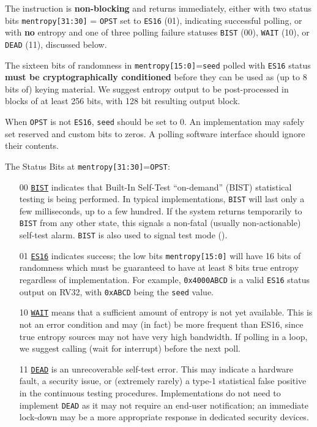     The instruction is {\bf non-blocking} and returns immediately, either
    with two status bits \verb|mentropy[31:30]| = \verb|OPST| set to
    \verb|ES16| (01), indicating successful polling, or with {\bf no}
    entropy and one of three polling failure statuses \verb|BIST| (00),
    \verb|WAIT| (10), or \verb|DEAD| (11), discussed below.


    The sixteen bits of randomness in \verb|mentropy[15:0]|=\verb|seed| polled
    with \verb|ES16| status {\bf must be cryptographically conditioned}
    before they can be used as (up to 8 bits of) keying material. We suggest
    entropy output to be post-processed in blocks of at least 256 bits,
    with 128 bit resulting output block.

    When  \verb|OPST| is not \verb|ES16|, \verb|seed| should be set to 0.
    An implementation may safely set reserved and custom bits to zeros.
    A polling software interface should ignore their contents.

    The Status Bits at \verb|mentropy[31:30]|=\verb|OPST|:

\begin{itemize}
    \item[00]   \underline{\tt BIST}
    indicates that Built-In Self-Test ``on-demand'' (BIST) statistical
    testing is being performed. In typical implementations,
    \verb|BIST| will last only a few milliseconds, up to a few hundred.
    If the system returns temporarily to \verb|BIST| from any other state,
    this signals a non-fatal (usually non-actionable) self-test alarm.
    {\tt BIST} is also used to signal test mode ().

    \item[01]   \underline{\tt ES16}
    indicates success; the low bits \verb|mentropy[15:0]| will have 16 bits
    of randomness which must be guaranteed to have at least 8 bits true
    entropy regardless of implementation. For example, \verb|0x4000ABCD|
    is a valid \verb|ES16| status output on RV32, with \verb|0xABCD| being
    the \verb|seed| value.

    \item[10]   \underline{\tt WAIT}
    means that a sufficient amount of entropy is not yet available.
    This is not an error condition and may (in fact) be more frequent than
    ES16, since true entropy sources may not have very high bandwidth.
    If polling in a loop, we suggest calling  (wait for
    interrupt) before the next poll.

    \item[11]   \underline{\tt DEAD}
    is an unrecoverable self-test error. This may indicate a hardware
    fault, a security issue, or (extremely rarely) a type-1
    statistical false positive in the continuous testing procedures.
    Implementations do not need to implement \verb|DEAD| as it may not require
    an end-user notification; an immediate lock-down may be a more
    appropriate response in dedicated security devices.
\end{itemize}


